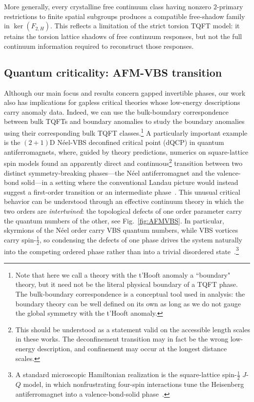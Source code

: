 \documentclass[aps,prx,reprint,superscriptaddress,twocolumn,amsmath,amssymb,amsfonts, nofootinbib]{revtex4-2}
\theoremstyle{apsstyle}
\begin{document}
More generally, every crystalline free continuum class having nonzero $2$-primary restrictions to finite spatial subgroups produces a compatible free-shadow family in $\ker(F_{2,H})$. This reflects a limitation of the strict torsion TQFT model: it retains the torsion lattice shadows of free continuum responses, but not the full continuum information required to reconstruct those responses.



\subsection{Quantum criticality: AFM-VBS transition}
\label{sec:afm_vbs}

Although our main focus and results concern gapped invertible phases, our work also has implications for gapless critical theories whose low-energy descriptions carry anomaly data. Indeed, we can use the bulk-boundary correspondence between bulk TQFTs and boundary anomalies to study the boundary anomalies using their corresponding bulk TQFT classes.\footnote{Note that here we call a theory with the t'Hooft anomaly a ``boundary" theory, but it need not be the literal physical boundary of a TQFT phase. The bulk-boundary correspondence is a conceptual tool used in analysis: the boundary theory can be well defined on its own as long as we do not gauge the global symmetry with the t'Hooft anomaly.} A particularly important example is the $(2{+}1)$D N\'eel-VBS deconfined critical point (dQCP) in quantum antiferromagnets, where, guided by theory predictions\cite{ScienceSenthil,Senthil_dqcp_prb, Levin2004}, numerics on square-lattice spin models found an apparently direct and continuous\footnote{This should be understood as a statement valid on the accessible length scales in these works. The deconfinement transition may in fact be the wrong low-energy description, and confinement may occur at the longest distance scales.} transition between two distinct symmetry-breaking phases—the N\'eel antiferromagnet and the valence-bond solid—in a setting where the conventional Landau picture would instead suggest a first-order transition or an intermediate phase~\cite{Sandvik2007,Melko2008,Lou2009,Sandvik2010,Nahum2015}. This unusual critical behavior  can be understood through an effective continuum theory in which the two orders are \emph{intertwined}: the topological defects of one order parameter carry the quantum numbers of the other, see Fig.~\ref{fig:AFMVBS}. In particular, skyrmions of the N\'eel order carry VBS quantum numbers, while VBS vortices carry spin-$\tfrac12$, so condensing the defects of one phase drives the system naturally into the competing ordered phase rather than into a trivial disordered state~\cite{ScienceSenthil,Senthil_dqcp_prb,Levin2004,ChongWang_dqcp}.\footnote{A standard microscopic Hamiltonian realization is the square-lattice spin-$\tfrac12$ $J$-$Q$ model, in which nonfrustrating four-spin interactions tune the Heisenberg antiferromagnet into a valence-bond-solid phase~\cite{Sandvik2007}.}
\end{document}
